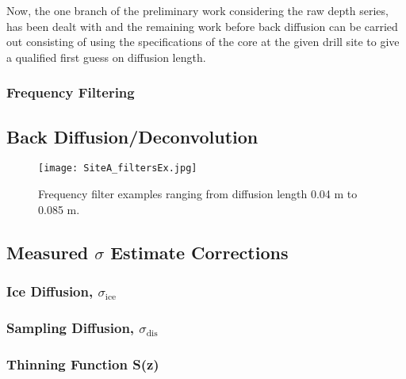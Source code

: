 \documentclass[../../CompleteThesis/Complete_1stDraft.tex]{subfiles}
\begin{document}
	Now, the one branch of the preliminary work considering the raw depth series, has been dealt with and the remaining work before back diffusion can be carried out consisting of using the specifications of the core at the given drill site to give a qualified first guess on diffusion length.
	
	\subsubsection[Frequency Filters]{Frequency Filtering}
	\label{Subsubsec:Method_FirstSigmaEstimate_BackDiffusion_FrequencyFilters}
	
	\subsection[Back Diffusion]{Back Diffusion/Deconvolution}
	\label{Subsec:Method_FirstSigmaEstimate_BackDiffusion}
	\begin{figure}[h]
		\centering
		\texttt{[image: SiteA\_filtersEx.jpg]}
		\caption[Frequency filters example, Site A]{Frequency filter examples ranging from diffusion length 0.04 m to 0.085 m.}
		\label{fig:SiteA_filtersEx}
	\end{figure}
	
	\subsection{Measured $\sigma$ Estimate Corrections}
	\label{Subsec:Method_FirstSigmaEstimate_Correction}
	
	
	\subsubsection[Ice diffusion]{Ice Diffusion, $\sigma_{\text{ice}}$}
	\label{Subsubsec:Method_FirstSigmaEstimate_Correction_IceDiffusion}
	
	\subsubsection[Sampling diffusion]{Sampling Diffusion, $\sigma_{\text{dis}}$}
	\label{Subsubsec:Method_FirstSigmaEstimate_Correction_SamplingDiffusion}
	
	
	\subsubsection[Thinning Function]{Thinning Function S(z)}
	\label{Subsubsec:Method_FirstSigmaEstimate_Correction_ThinningFunction}
	
\end{document}
